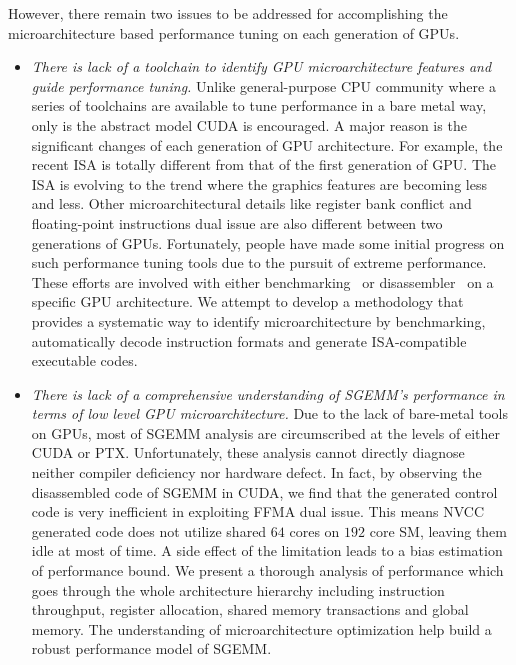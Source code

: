 \documentclass{sig-alternate-05-2015}
\begin{document}
However, there remain two issues to be addressed for accomplishing the microarchitecture based performance tuning on each generation of GPUs.
\begin{itemize}
\item {\em There is lack of a toolchain to identify GPU microarchitecture features and guide performance tuning.} Unlike general-purpose CPU community where a series of toolchains are available to tune performance in a bare metal way, only is the abstract model CUDA is encouraged. A major reason is the significant changes of each generation of GPU architecture. For example, the recent ISA is totally different from that of the first generation of GPU. The ISA is evolving to the trend where the graphics features are becoming less and less. Other microarchitectural details like register bank conflict and floating-point instructions dual issue are also different between two generations of GPUs. Fortunately, people have made some initial progress on such performance tuning tools due to the pursuit of extreme performance. These efforts are involved with either benchmarking~\cite{} or disassembler~\cite{} on a specific GPU architecture. We attempt to develop a methodology that provides a systematic way to identify microarchitecture by benchmarking, automatically decode instruction formats and generate ISA-compatible executable codes.

\item {\em There is lack of a comprehensive understanding of SGEMM's performance in terms of low level GPU microarchitecture.} Due to the lack of bare-metal tools on GPUs, most of SGEMM analysis are circumscribed at the levels of either CUDA  or PTX. Unfortunately, these analysis cannot directly diagnose neither compiler deficiency nor hardware defect. In fact, by observing the disassembled code of SGEMM in CUDA, we find that the generated control code is
very inefficient in exploiting FFMA dual issue. This means NVCC generated code does not
utilize shared $64$ cores on $192$ core SM, leaving them idle at most of time. A side effect of the limitation leads to a bias estimation of performance bound. We present a thorough analysis of performance which goes through the whole architecture hierarchy including instruction throughput, register allocation, shared memory transactions and global memory. The understanding of microarchitecture optimization help build a robust performance model of SGEMM.


\end{itemize}
\end{document}
